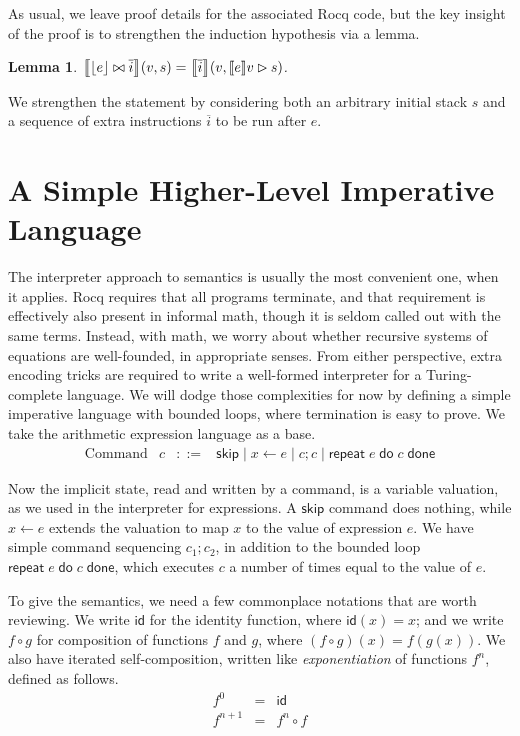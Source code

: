 \documentclass{amsbook}
\newtheorem{lemma}[theorem]{Lemma}
\theoremstyle{definition}
\theoremstyle{remark}
\numberwithin{section}{chapter}
\numberwithin{equation}{chapter}
\begin{document}
As usual, we leave proof details for the associated Rocq code, but the key insight of the proof is to strengthen the induction hypothesis via a lemma.

\begin{lemma}
  ${\left \llbracket {\left \lfloor e \right \rfloor} \bowtie \overline{i} \right \rrbracket}(v, s) = {\left \llbracket \overline{i} \right \rrbracket}(v, {\left \llbracket e \right \rrbracket}v \rhd s)$.
\end{lemma}

We strengthen the statement by considering both an arbitrary initial stack $s$ and a sequence of extra instructions $\overline{i}$ to be run after $e$.

\section{A Simple Higher-Level Imperative Language}

\newcommand{\repet}[2]{\mathsf{repeat} \; #1 \; \mathsf{do} \; #2 \; \mathsf{done}}

The interpreter approach to semantics is usually the most convenient one, when it applies.
Rocq requires that all programs terminate, and that requirement is effectively also present in informal math, though it is seldom called out with the same terms.
Instead, with math, we worry about whether recursive systems of equations are well-founded, in appropriate senses.
From either perspective, extra encoding tricks are required to write a well-formed interpreter for a Turing-complete language.
We will dodge those complexities for now by defining a simple imperative language with bounded loops, where termination is easy to prove.
We take the arithmetic expression language as a base.
\encoding
$$\begin{array}{rrcl}
  \textrm{Command} & c &::=& \mathsf{skip} \mid x \leftarrow e \mid c; c \mid \repet{e}{c}
\end{array}$$

Now the implicit state, read and written by a command, is a variable valuation, as we used in the interpreter for expressions.
A $\mathsf{skip}$ command does nothing, while $x \leftarrow e$ extends the valuation to map $x$ to the value of expression $e$.
We have simple command sequencing $c_1; c_2$, in addition to the bounded loop $\repet{e}{c}$, which executes $c$ a number of times equal to the value of $e$.

\newcommand{\id}[0]{\mathsf{id}}

To give the semantics, we need a few commonplace notations that are worth reviewing.
We write $\id$ for the identity function, where $\id(x) = x$; and we write $f \circ g$ for composition of functions $f$ and $g$, where $(f \circ g)(x) = f(g(x))$.
We also have iterated self-composition, written like \emph{exponentiation} of functions $f^n$, defined as follows.
\begin{eqnarray*}
  f^0 &=& \id \\
  f^{n+1} &=& f^n \circ f
\end{eqnarray*}
\end{document}
